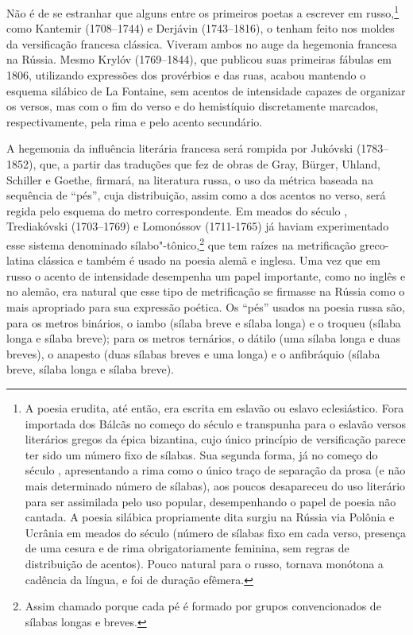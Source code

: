Não é de se estranhar que alguns entre os primeiros poetas a escrever em
rus­so,\footnote{A poesia erudita, até então, era escrita em eslavão ou eslavo eclesiástico. Fora importada dos Bálcãs no começo do século  e transpunha para o eslavão versos literários gregos da épica bizantina, cujo único princípio de versificação parece ter sido um número fixo de sílabas. Sua segunda forma, já no começo do século , apresentando a rima como o único traço de separação da prosa (e não mais determinado número de sílabas), aos poucos desapareceu do uso literário para ser assimilada pelo uso popular, desempenhando o papel de poesia não cantada. A poesia silábica propriamente dita surgiu na Rússia via Polônia e Ucrânia em meados do século  (número de sílabas fixo em cada verso, presença de uma cesura e de rima obrigatoriamente feminina, sem regras de distribuição de acentos). Pouco natural para o russo, tornava monótona a cadência da língua, e foi de duração efêmera.} como Kantemir (1708--1744) e Derjávin (1743--1816), o tenham feito nos moldes da
versificação fran­cesa clássica. Viveram ambos no auge da hegemonia
francesa na Rússia. Mesmo
Krylóv (1769--1844), que publicou suas primeiras fábulas em 1806, utilizando expressões
dos provérbios e das ruas, acabou man­tendo o esquema silábico de La
Fontaine, sem acentos de intensidade capazes de organizar os versos, mas
com o fim do verso e do hemistíquio discreta­mente marcados,
respectivamente, pela rima e pelo acento secundário.

A hegemonia da influência literária francesa será rompida por Jukóvski (1783--1852),
que, a partir das traduções que fez de obras de Gray, Bürger, Uhland,
Schiller e Goethe, firmará, na literatura russa, o uso da métrica baseada
na sequência de ``pés'', cuja distribuição, assim como a dos
acentos no verso, será regida pelo esquema do metro correspondente. Em
meados do século , Trediakóvski (1703--1769)
e Lomonóssov (1711-1765) já haviam
experimentado esse sistema denomina­do sílabo"-tônico,\footnote{Assim chamado porque cada pé é formado por grupos convencionados de sílabas longas e breves.} que tem raízes na
metrificação greco-latina clássica e tam­bém é usado na poesia alemã e
inglesa. Uma vez que em russo o acento de intensidade desempenha um
papel importante, como no inglês e no alemão, era natural que esse tipo
de metrificação se firmasse na Rússia como o mais apropriado para
sua expressão poética. Os ``pés'' usados na poesia russa são, para os
metros binários, o iambo (sílaba breve e sílaba longa) e o troqueu
(sílaba longa e sílaba breve); para os metros ternários, o dátilo (uma
sílaba lon­ga e duas breves), o anapesto (duas sílabas breves e uma
longa) e o anfibráquio (sílaba breve, sílaba longa e sílaba breve).

